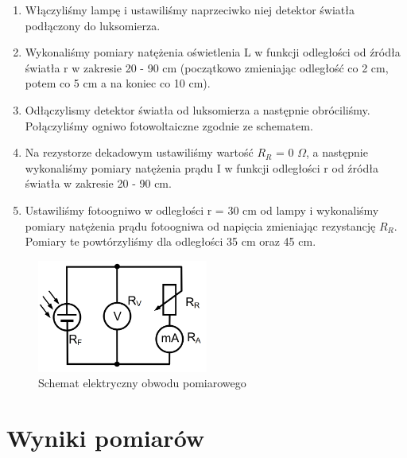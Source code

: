 \documentclass[polish, a4paper]{article}
\begin{document}
\begin{enumerate}
\item{Włączyliśmy lampę i ustawiliśmy naprzeciwko niej detektor światła podłączony do luksomierza.}
\item{Wykonaliśmy pomiary natężenia oświetlenia L w funkcji odległości od źródła światła r w zakresie 20 - 90 cm (początkowo zmieniając odległość co 2 cm, potem co 5 cm a na koniec co 10 cm).}
\item{Odłączylismy detektor światła od luksomierza a następnie obróciliśmy. Połączyliśmy ogniwo fotowoltaiczne zgodnie ze schematem.}
\item{Na rezystorze dekadowym ustawiliśmy wartość $R_R$ = 0 $\Omega$, a następnie wykonaliśmy pomiary natężenia prądu I w funkcji odległości r od źródła światła w zakresie 20 - 90 cm.}
\item{Ustawiliśmy fotoogniwo w odległości r = 30 cm od lampy i wykonaliśmy pomiary natężenia prądu fotoogniwa od napięcia zmieniając rezystancję $R_R$. Pomiary te powtórzyliśmy dla odległości 35 cm oraz 45 cm.}
\end{enumerate}

\begin{figure}[H]
\centering
\includegraphics[width=0.5\textwidth]{uklad.png}
\caption{Schemat elektryczny obwodu pomiarowego}
\end{figure}

\section{Wyniki pomiarów}
\end{document}
